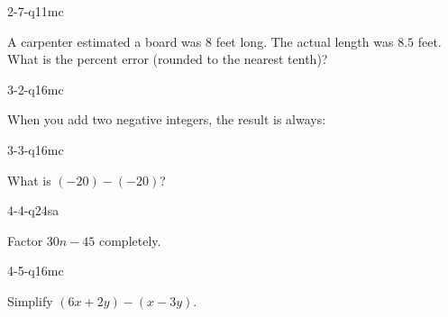 \begin{practiceQuestion}{2-7-q11}{mc}
\begin{questionText}
A carpenter estimated a board was $8$ feet long. The actual length was $8.5$ feet. What is the percent error (rounded to the nearest tenth)?
\end{questionText}
\end{practiceQuestion}

\begin{practiceQuestion}{3-2-q16}{mc}
\begin{questionText}
When you add two negative integers, the result is always:
\end{questionText}
\end{practiceQuestion}

\begin{practiceQuestion}{3-3-q16}{mc}
\begin{questionText}
What is $(-20) - (-20)$?
\end{questionText}
\end{practiceQuestion}

\begin{practiceQuestion}{4-4-q24}{sa}
\begin{questionText}
Factor $30n - 45$ completely.
\end{questionText}
\end{practiceQuestion}

\begin{practiceQuestion}{4-5-q16}{mc}
\begin{questionText}
Simplify $(6x + 2y) - (x - 3y)$.
\end{questionText}
\end{practiceQuestion}

